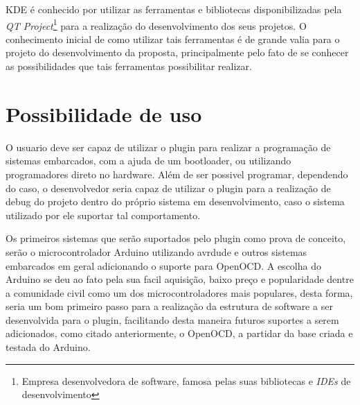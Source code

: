 
KDE é conhecido por utilizar as ferramentas e bibliotecas disponibilizadas pela \textit{QT Project}\footnote{Empresa desenvolvedora
de software, famosa pelas suas bibliotecas e \textit{IDEs} de desenvolvimento} para a realização do desenvolvimento dos seus projetos.
O conhecimento inicial de como utilizar tais ferramentas é de grande valia para o projeto do desenvolvimento da proposta,
principalmente pelo fato de se conhecer as possibilidades que tais ferramentas possibilitar realizar.

\section{Possibilidade de uso}
O usuario deve ser capaz de utilizar o plugin para realizar a programação de sistemas embarcados, com a ajuda de um bootloader, ou
utilizando programadores direto no hardware. Além de ser possivel programar, dependendo do caso, o desenvolvedor seria capaz de
utilizar o plugin para a realização de debug do projeto dentro do próprio sistema em desenvolvimento, caso o sistema utilizado por ele
suportar tal comportamento.

Os primeiros sistemas que serão suportados pelo plugin como prova de conceito, serão o microcontrolador Arduino utilizando avrdude e
outros sistemas embarcados em geral adicionando o suporte para OpenOCD. A escolha do Arduino se deu ao fato pela sua facil aquisição,
baixo preço e popularidade dentre a comunidade civil como um dos microcontroladores mais populares, desta forma, seria um bom primeiro
passo para a realização da estrutura de software a ser desenvolvida para o plugin, facilitando desta maneira futuros suportes a serem
adicionados, como citado anteriormente, o OpenOCD, a partidar da base criada e testada do Arduino.


